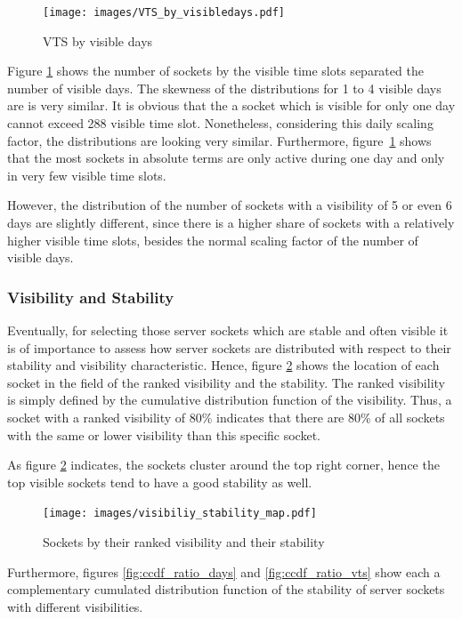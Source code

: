 \begin{figure}
	[hb] \centering 
	\texttt{[image: images/VTS\_by\_visibledays.pdf]}
	\caption{VTS by visible days} 
	\label{fig:vts_by_visibledays} 
\end{figure}

Figure \ref{fig:vts_by_visibledays} shows the number of sockets by the visible time slots separated the number of visible days. The skewness of the 
distributions for 1 to 4 visible days are is very similar. It is obvious that 
the a socket which is visible for only one day cannot exceed 288 visible time 
slot. Nonetheless, considering this daily scaling factor, the distributions are 
looking very similar. Furthermore, figure \ref{fig:vts_by_visibledays} shows 
that the most sockets in absolute terms are only active during one day and only 
in very few visible time slots. 

However, the distribution of the number of sockets with a visibility of 5 or 
even 6 days are slightly different, since there is a higher share of sockets 
with a relatively higher visible time slots, besides the normal scaling factor 
of the number of visible days.

\subsubsection{Visibility and Stability}
Eventually, for selecting those \glspl{server socket} which are stable and often visible it is of importance to assess how \glspl{server socket} are distributed with respect to their stability and visibility characteristic. Hence, figure \ref{fig:rankedVisibility} shows the location of each socket in the field of the ranked visibility and the stability. The ranked visibility is simply defined by the cumulative distribution function of the visibility. Thus, a socket with a ranked visibility of 80\% indicates that there are 80\% of all sockets with the same or lower visibility than this specific socket. 

As figure \ref{fig:rankedVisibility} indicates, the sockets cluster around the top right corner, hence the top visible sockets tend to have a good stability as well.

\begin{figure}
	[hb] \centering 
	\texttt{[image: images/visibiliy\_stability\_map.pdf]}
	\caption{Sockets by their ranked visibility and their stability} 
	\label{fig:rankedVisibility} 
\end{figure}


Furthermore, figures \ref{fig:ccdf_ratio_days} and \ref{fig:ccdf_ratio_vts} show 
each a complementary cumulated distribution function of the stability of server 
sockets with different visibilities. 

